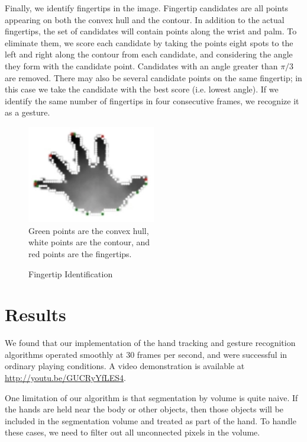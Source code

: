 \documentclass[12pt]{article}
\begin{document}
Finally, we identify fingertips in the image.  Fingertip candidates are all points appearing on both the convex hull and the contour.  In addition to the actual fingertips, the set of candidates will contain points along the wrist and palm.  To eliminate them, we score each candidate by taking the points eight spots to the left and right along the contour from each candidate, and considering the angle they form with the candidate point.  Candidates with an angle greater than $\pi/3$ are removed.  There may also be several candidate points on the same fingertip; in this case we take the candidate with the best score (i.e. lowest angle).  If we identify the same number of fingertips in four consecutive frames, we recognize it as a gesture.

\begin{figure}
\caption{Fingertip Identification}
\centering
\includegraphics[width=0.5\textwidth, natwidth=443, natheight=337]{Fingertip_Identification.jpg}\\
Green points are the convex hull,\\
white points are the contour, and\\
red points are the fingertips.
\end{figure}



\section{Results}
We found that our implementation of the hand tracking and gesture recognition algorithms operated smoothly at 30 frames per second, and were successful in ordinary playing conditions.  A video demonstration is available at \href{http://youtu.be/GUCRyYfLES4}{http://youtu.be/GUCRyYfLES4}.

One limitation of our algorithm is that segmentation by volume is quite naive.  If the hands are held near the body or other objects, then those objects will be included in the segmentation volume and treated as part of the hand.  To handle these cases, we need to filter out all unconnected pixels in the volume.
\end{document}
